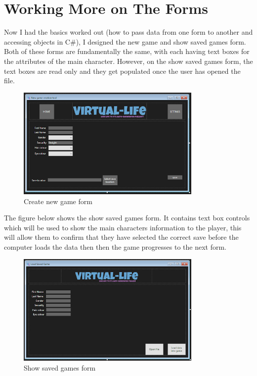 \section{Working More on The Forms}
Now I had the basics worked out (how to pass data from one form to another and accessing objects in C\#), I designed the new game and show saved games form. Both of these forms are fundamentally the same, with each having text boxes for the attributes of the main character. However, on the show saved games form, the text boxes are read only and they get populated once the user has opened the file.
\begin{figure}[H]
    \centering
    \includegraphics[width=0.8\textwidth]{images/implementation/newGameForm.png}
    \caption{Create new game form}
    \label{fig:implementation-newGameForm}
\end{figure}
\noindent The figure below shows the show saved games form. It contains text box controls which will be used to show the main characters information to the player, this will allow them to confirm that they have selected the correct save before the computer loads the data then then the game progresses to the next form.
\begin{figure}[H]
    \centering
    \includegraphics[width=0.8\textwidth]{images/implementation/showSavedGamesForm.png}
    \caption{Show saved games form}
    \label{fig:implementation-showSavedGamesForm}
\end{figure}


